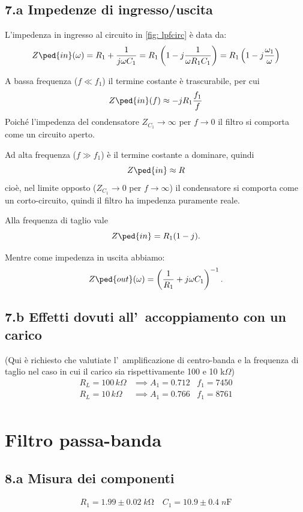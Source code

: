 \documentclass[10pt,a4paper]{article}
\begin{document}
\subsection*{7.a Impedenze di ingresso/uscita}
L'impedenza in ingresso al circuito in \ref{fig: lpfcirc} è data da:
\[
Z\ped{in}(\omega) = R_1 + \frac{1}{j \omega C_1} =
R_1 \left( 1 - j \frac{1}{\omega R_1 C_1} \right) =
R_1 \left( 1 - j \frac{\omega_1}{\omega} \right)
\]

A bassa frequenza ($f \ll f_1$) il termine costante è trascurabile, per cui
\[
Z\ped{in}(f) \approx -jR_1 \frac{f_1}{f}
\]
Poiché l'impedenza del condensatore $Z_{C_1} \to \infty$ per $f \to 0$
il filtro si comporta come un circuito aperto.

Ad alta frequenza ($f \gg f_1$) è il termine costante a dominare, quindi
\[
Z\ped{in} \approx R
\]
cioè, nel limite opposto ($Z_{C_1} \to 0$ per $f \to \infty$) il
condensatore si comporta come un corto-circuito, quindi il filtro ha
impedenza puramente reale.

Alla frequenza di taglio vale
\[
Z\ped{in} = R_1 (1 - j)
.\]

Mentre come impedenza in uscita abbiamo:
\[
Z\ped{out}(\omega) = \left(\frac{1}{R_1} + j\omega C_1\right)^{-1}
.\]

\subsection*{7.b Effetti dovuti all'~accoppiamento con un carico}
(Qui \`e richiesto che valutiate l'~amplificazione di centro-banda e la 
frequenza di taglio nel 
caso in cui il carico sia rispettivamente 100 e 10 k$\Omega$)
\[
\begin{array}{rl}
R_L=100 \,k\Omega & \implies A_1 = 0.712 \;\;\; f_1 = 7450 \\
R_L=10 \,k\Omega & \implies A_1 = 0.766\;\;\; f_1 = 8761 \\
\end{array}
\]

\section*{Filtro passa-banda}

\subsection*{8.a Misura dei componenti}
\begin{align*}
R_1 = 1.99 \pm 0.02 \; \si{k\ohm} \quad C_1 = 10.9 \pm 0.4 \; \si{n\F}
\end{align*}
\end{document}
